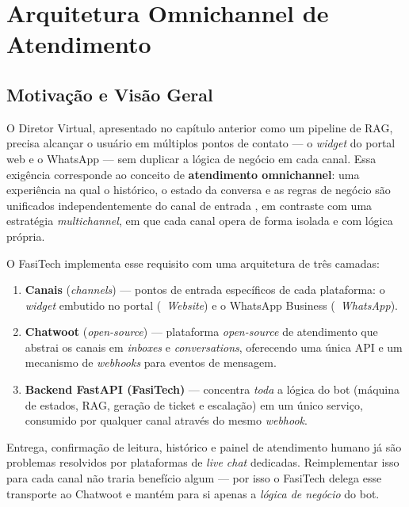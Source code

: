 \documentclass[12pt,a4paper]{report}
\begin{document}
\chapter{Arquitetura Omnichannel de Atendimento}

\section{Motivação e Visão Geral}

O Diretor Virtual, apresentado no capítulo anterior como um pipeline de RAG,
precisa alcançar o usuário em múltiplos pontos de contato — o \textit{widget}
do portal web e o WhatsApp — sem duplicar a lógica de negócio em cada canal.
Essa exigência corresponde ao conceito de \textbf{atendimento omnichannel}:
uma experiência na qual o histórico, o estado da conversa e as regras de
negócio são unificados independentemente do canal de entrada
\autocite{verhoef2015omnichannel}, em contraste com uma estratégia
\textit{multichannel}, em que cada canal opera de forma isolada e com lógica
própria.

O FasiTech implementa esse requisito com uma arquitetura de três camadas:

\begin{enumerate}
  \item \textbf{Canais} (\textit{channels}) — pontos de entrada específicos de
        cada plataforma: o \textit{widget} embutido no portal
        (\faGlobe~\textit{Website}) e o WhatsApp Business
        (\faWhatsapp~\textit{WhatsApp}).
  \item \textbf{Chatwoot} \autocite{chatwoot2023} (\textit{open-source}) — plataforma
        \textit{open-source} de atendimento que abstrai os canais em
        \textit{inboxes} e \textit{conversations}, oferecendo uma única API
        e um mecanismo de \textit{webhooks} para eventos de mensagem.
  \item \textbf{Backend FastAPI (FasiTech)} — concentra \emph{toda} a lógica
        do bot (máquina de estados, RAG, geração de ticket e escalação) em
        um único serviço, consumido por qualquer canal através do mesmo
        \textit{webhook}.
\end{enumerate}

\begin{insight}[title={Chatwoot como camada de roteamento}]
Entrega, confirmação de leitura, histórico e painel de atendimento humano
já são problemas resolvidos por plataformas de \textit{live chat}
dedicadas. Reimplementar isso para cada canal não traria benefício algum —
por isso o FasiTech delega esse transporte ao Chatwoot e mantém para si
apenas a \emph{lógica de negócio} do bot.
\end{insight}
\end{document}

